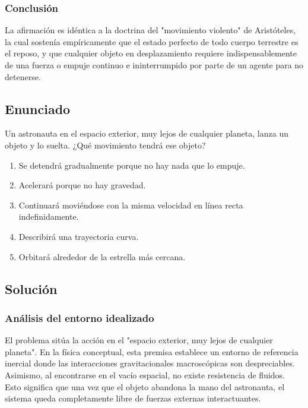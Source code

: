 \documentclass[12pt, a4paper]{article}
\begin{document}
\subsubsection*{Conclusión}
La afirmación es idéntica a la doctrina del "movimiento violento" de Aristóteles, la cual sostenía empíricamente que el estado perfecto de todo cuerpo terrestre es el reposo, y que cualquier objeto en desplazamiento requiere indispensablemente de una fuerza o empuje continuo e ininterrumpido por parte de un agente para no detenerse.

\newpage

\subsection*{Enunciado}
Un astronauta en el espacio exterior, muy lejos de cualquier planeta, lanza un objeto y lo suelta. ¿Qué movimiento tendrá ese objeto?
\begin{enumerate}
    \item[a)] Se detendrá gradualmente porque no hay nada que lo empuje.
    \item[b)] Acelerará porque no hay gravedad.
    \item[c)] Continuará moviéndose con la misma velocidad en línea recta indefinidamente.
    \item[d)] Describirá una trayectoria curva.
    \item[e)] Orbitará alrededor de la estrella más cercana.
\end{enumerate}

\subsection*{Solución}

\subsubsection*{Análisis del entorno idealizado}
El problema sitúa la acción en el "espacio exterior, muy lejos de cualquier planeta". En la física conceptual, esta premisa establece un entorno de referencia inercial donde las interacciones gravitacionales macroscópicas son despreciables. Asimismo, al encontrarse en el vacío espacial, no existe resistencia de fluidos. Esto significa que una vez que el objeto abandona la mano del astronauta, el sistema queda completamente libre de fuerzas externas interactuantes.
\end{document}
